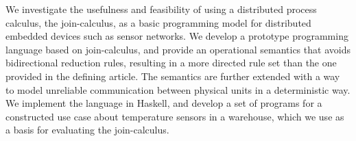 We investigate the usefulness and feasibility of using a distributed process
calculus, the join-calculus, as a basic programming model for distributed
embedded devices such as sensor networks.
We develop a prototype programming language based on join-calculus, and provide
an operational semantics that avoids bidirectional reduction rules, resulting
in a more directed rule set than the one provided in the defining
article\cite{fournet1996reflexive}. The semantics are further extended with a
way to model unreliable communication between physical units in a deterministic
way.
We implement the language in Haskell, and develop a set of programs for a
constructed use case about temperature sensors in a warehouse, which we use as
a basis for evaluating the join-calculus.

